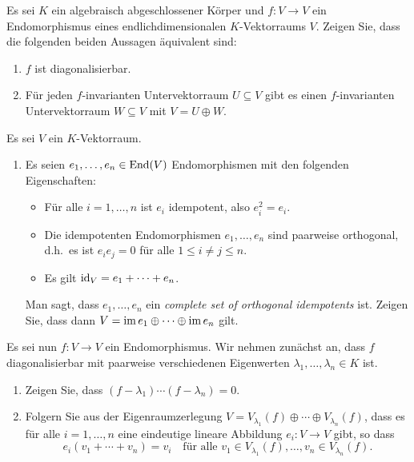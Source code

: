 \documentclass[a4paper,10pt]{scrartcl}
\begin{document}
\begin{question}
  Es sei $K$ ein algebraisch abgeschlossener Körper und $f \colon V \to V$ ein Endomorphismus eines endlichdimensionalen $K$-Vektorraums $V$.
  Zeigen Sie, dass die folgenden beiden Aussagen äquivalent sind:
  \begin{enumerate}
    \item
      $f$ ist diagonalisierbar.
    \item
      Für jeden $f$-invarianten Untervektorraum $U \subseteq V$ gibt es einen $f$-invarianten Untervektorraum $W \subseteq V$ mit $V = U \oplus W$.
  \end{enumerate}
\end{question}


\begin{question}
  Es sei $V$ ein $K$-Vektorraum.
  \begin{enumerate}[leftmargin=*]
    \item
      Es seien $e_1, \dotsc, e_n \in \operatorname{End}(V)$ Endomorphismen mit den folgenden Eigenschaften:
      \begin{itemize}
        \item
          Für alle $i = 1, \dotsc, n$ ist $e_i$ idempotent, also $e_i^2 = e_i$.
        \item
          Die idempotenten Endomorphismen $e_1, \dotsc, e_n$ sind paarweise orthogonal, d.h.\ es ist $e_i e_j = 0$ für alle $1 \leq i \neq j \leq n$.
        \item
          Es gilt $\operatorname{id}_V = e_1 + \dotsb + e_n$.
      \end{itemize}
      Man sagt, dass $e_1, \dotsc, e_n$ ein \emph{complete set of orthogonal idempotents} ist.
      Zeigen Sie, dass dann $V = \operatorname{im} e_1 \oplus \dotsb \oplus \operatorname{im} e_n$ gilt.
  \end{enumerate}
  Es sei nun $f \colon V \to V$ ein Endomorphismus.
  Wir nehmen zunächst an, dass $f$ diagonalisierbar mit paarweise verschiedenen Eigenwerten $\lambda_1, \dotsc, \lambda_n \in K$ ist.
  \begin{enumerate}[resume]
    \item
      Zeigen Sie, dass $(f - \lambda_1) \dotsm (f - \lambda_n) = 0$.
    \item
      Folgern Sie aus der Eigenraumzerlegung $V = V_{\lambda_1}(f) \oplus \dotsb \oplus V_{\lambda_n}(f)$, dass es für alle $i = 1, \dotsc, n$ eine eindeutige lineare Abbildung $e_i \colon V \to V$ gibt, so dass
      \[
          e_i(v_1 + \dotsb + v_n)
        = v_i
        \quad
        \text{für alle $v_1 \in V_{\lambda_1}(f), \dotsc, v_n \in V_{\lambda_n}(f)$}.
\]
\end{enumerate}
\end{question}
\end{document}
